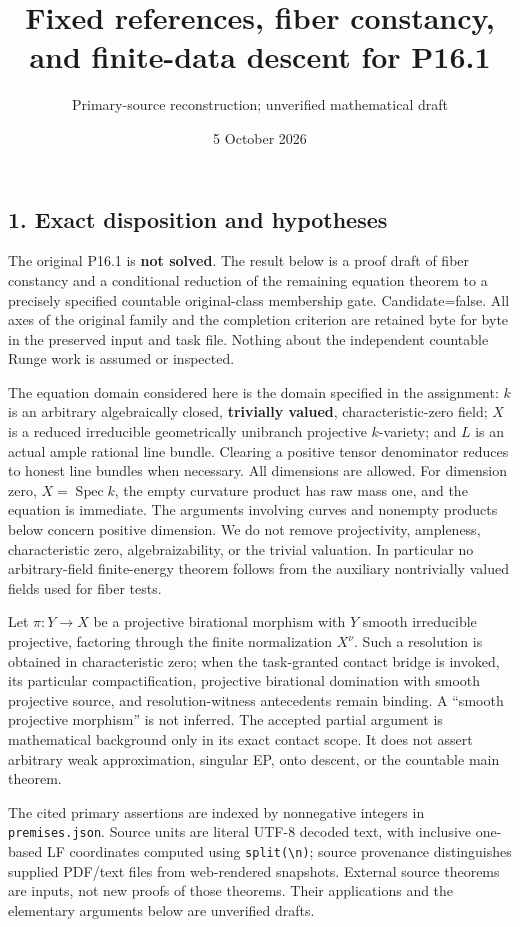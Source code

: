 \documentclass[
  10pt,
]{article}
\title{Fixed references, fiber constancy, and finite-data descent for
P16.1}
\author{Primary-source reconstruction; unverified mathematical draft}
\date{5 October 2026}
\begin{document}
\maketitle

\subsection{1. Exact disposition and
hypotheses}\label{exact-disposition-and-hypotheses}

The original P16.1 is \textbf{not solved}. The result below is a proof
draft of fiber constancy and a conditional reduction of the remaining
equation theorem to a precisely specified countable original-class
membership gate. Candidate=false. All axes of the original family and
the completion criterion are retained byte for byte in the preserved
input and task file. Nothing about the independent countable Runge work
is assumed or inspected.

The equation domain considered here is the domain specified in the
assignment: \(k\) is an arbitrary algebraically closed,
\textbf{trivially valued}, characteristic-zero field; \(X\) is a reduced
irreducible geometrically unibranch projective \(k\)-variety; and \(L\)
is an actual ample rational line bundle. Clearing a positive tensor
denominator reduces to honest line bundles when necessary. All
dimensions are allowed. For dimension zero, \(X=\operatorname{Spec}k\),
the empty curvature product has raw mass one, and the equation is
immediate. The arguments involving curves and nonempty products below
concern positive dimension. We do not remove projectivity, ampleness,
characteristic zero, algebraizability, or the trivial valuation. In
particular no arbitrary-field finite-energy theorem follows from the
auxiliary nontrivially valued fields used for fiber tests.

Let \(\pi:Y\to X\) be a projective birational morphism with \(Y\) smooth
irreducible projective, factoring through the finite normalization
\(X^\nu\). Such a resolution is obtained in characteristic zero; when
the task-granted contact bridge is invoked, its particular
compactification, projective birational domination with smooth
projective source, and resolution-witness antecedents remain binding. A
``smooth projective morphism'' is not inferred. The accepted partial
argument is mathematical background only in its exact contact scope. It
does not assert arbitrary weak approximation, singular EP, onto descent,
or the countable main theorem.

The cited primary assertions are indexed by nonnegative integers in
\texttt{premises.json}. Source units are literal UTF-8 decoded text,
with inclusive one-based LF coordinates computed using
\texttt{split(\textquotesingle{}\textbackslash{}n\textquotesingle{})};
source provenance distinguishes supplied PDF/text files from
web-rendered snapshots. External source theorems are inputs, not new
proofs of those theorems. Their applications and the elementary
arguments below are unverified drafts.
\end{document}
